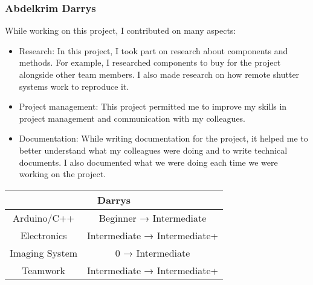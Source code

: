 \newpage
\subsubsection*{Abdelkrim Darrys}



While working on this project, I contributed on many aspects:
\begin{itemize}
    \item Research: In this project, I took part on research about components and methods. For example, I researched components to buy for the project alongside other team members. I also made research on how remote shutter systems work to reproduce it.
    \item Project management: This project permitted me to improve my skills in project management and communication with my colleagues. 
    \item Documentation: While writing documentation for the project, it helped me to better understand what my colleagues were doing and to write technical documents. I also documented what we were doing each time we were working on the project.
\end{itemize}


\begin{table}[!h]
    \centering
    \begin{tabular}{|cc|}
    \hline
    \multicolumn{2}{|c|}{\cellcolor[HTML]{3531FF}Darrys}                \\ \hline
    \multicolumn{1}{|c|}{Arduino/C++}    & Beginner → Intermediate      \\ \hline
    \multicolumn{1}{|c|}{Electronics}    & Intermediate → Intermediate+ \\ \hline
    \multicolumn{1}{|c|}{Imaging System} & 0 → Intermediate             \\ \hline
    \multicolumn{1}{|c|}{Teamwork}       & Intermediate → Intermediate+ \\ \hline
    \end{tabular}
\end{table}
